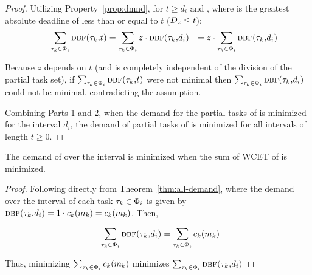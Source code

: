 \documentclass[a4paper,UKenglish,cleveref,autoref,english]{lipics-v2019}
\begin{document}
\begin{theorem}
\begin{proof}
  Utilizing Property~\ref{prop:dmnd}, for ${t \ge d_i}$ and
  , where  is the greatest absolute deadline
  of  less than or equal to ${t}$ (${D_{z} \le t}$): %
  \begin{equation*}
    \indent
    \begin{split}
    \sum_{\task{k} \in \Partial{i}} \dbf{\task{k}}{${t}$} &=
      \sum_{\task{k} \in \Partial{i}} z \cdot
      \dbf{\task{k}}{\deadline{i}} 
      & = z \cdot \sum_{\task{k} \in \Partial{i}} \dbf{\task{k}}{\deadline{i}}
    \end{split}
  \end{equation*}

  Because ${z}$ depends on ${t}$ (and is completely independent of the
  division of the partial task set), if ${\sum_{\tau_{k} \in \Phi_{i}}
    \text{\sc{dbf}(\ensuremath{\tau_{k}},$t$)}}$ were not minimal then
  ${\sum_{\tau_{k} \in \Phi_{i}} \text{\sc{dbf}(\ensuremath{\tau_{k}},\ensuremath{d_{i}})}}$ could not
  be minimal, contradicting the assumption.

  Combining Parts 1 and 2, when the demand for the partial tasks of
   is minimized for the interval ${d_i}$, the demand of
  partial tasks of  is minimized for all intervals of length 
  ${t \ge 0}$.    
\end{proof}
\end{theorem}

\begin{corollary}
  \label{corollary:min-demand-di}
  The demand of  over the interval  is
  minimized when the sum of WCET of  is minimized.
\begin{proof} Following directly from
  Theorem~\ref{thm:all-demand}, where the demand over the interval
   of each task ${\tau_{k} \in \Phi_{i}}$ is given by
  ${\text{\sc{dbf}(\ensuremath{\tau_{k}},\ensuremath{d_{i}})} = 1 \cdot c_k(m_k) =
    c_k(m_k)}$. Then,

  \begin{equation*}
    \indent
    \begin{split}
      \sum_{\task{k} \in \Partial{i}} \dbf{\task{k}}{\deadline{i}} &=
        \sum_{\task{k} \in \Partial{i}} c_k(m_k)
    \end{split}
  \end{equation*}

  Thus, minimizing ${\sum_{\tau_{k} \in \Phi_{i}} c_k(m_k)}$
  minimizes ${\sum_{\tau_{k} \in \Phi_{i}}
  \text{\sc{dbf}(\ensuremath{\tau_{k}},\ensuremath{d_{i}})}}$
\end{proof}

\end{corollary}
\end{document}
